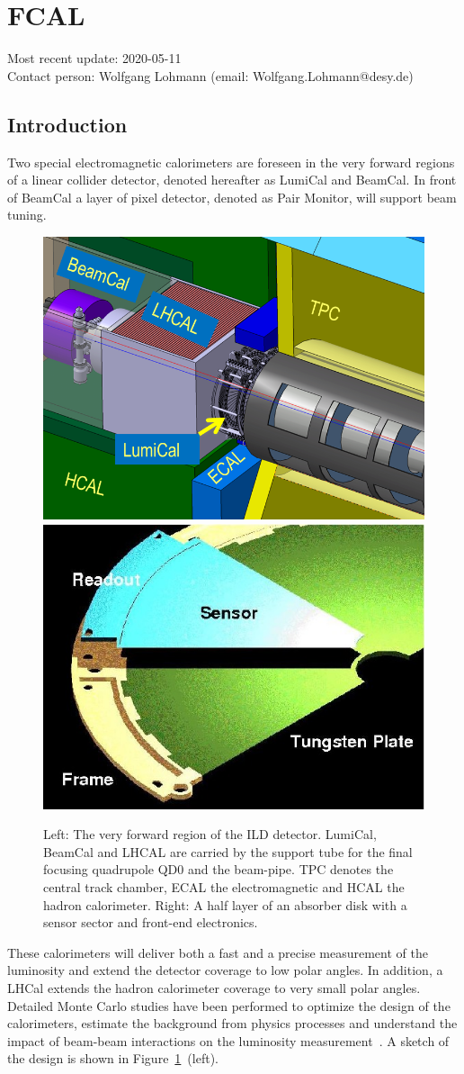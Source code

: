 \section{FCAL}
Most recent update: 2020-05-11 \\
Contact person: Wolfgang Lohmann (email: Wolfgang.Lohmann@desy.de)

\subsection{Introduction}
Two special electromagnetic calorimeters are foreseen in the very forward regions of a linear collider detector, denoted hereafter as
LumiCal and BeamCal. In front of BeamCal a layer of pixel detector, denoted as Pair Monitor, will support beam tuning.
\begin{figure}[hbp]
  \centering
   \includegraphics[width=0.45\columnwidth]{Calorimeter/FCAL/figs/forward_region_new} \hfill
   \includegraphics[width=0.45\columnwidth]{Calorimeter/FCAL/figs/BClayer}
  \caption{Left: The very forward region of the ILD detector.
  LumiCal, BeamCal and LHCAL are carried by
  the support tube for the final focusing quadrupole QD0 and the beam-pipe.
  TPC denotes the central track chamber, ECAL the electromagnetic and
  HCAL the hadron calorimeter.
  Right: A half layer of an absorber disk with a sensor sector and front-end electronics.}
  \label{fig:Forward_structure}
\end{figure}
These calorimeters will deliver both a fast and a precise measurement of the luminosity
and extend the detector coverage to low polar angles.
In addition, a LHCal extends the hadron calorimeter coverage to very small polar angles.
Detailed Monte Carlo studies have been performed to
optimize the design of the calorimeters, estimate the background from physics processes and understand the impact
of beam-beam interactions on the luminosity measurement~\cite{2010JInst...512002A}.
A sketch of the design is shown in Figure~\ref{fig:Forward_structure}~(left).

